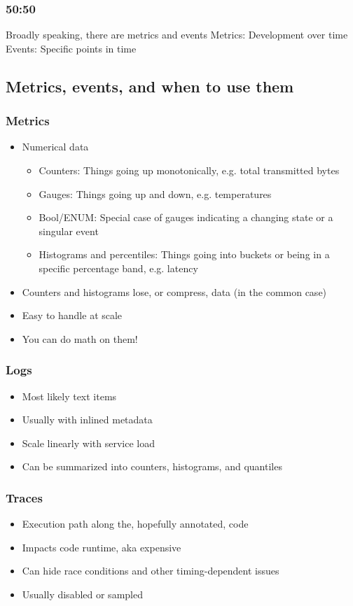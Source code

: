 \documentclass[aspectratio=169]{beamer}
\begin{document}
\begin{frame}
	\frametitle{50:50}
	\begin{center}
		\vfill
		Broadly speaking, there are metrics and events
		\vfill
		Metrics: Development over time
		\vfill
		Events: Specific points in time
		\vfill
	\end{center}
\end{frame}


\subsection{Metrics, events, and when to use them}

\begin{frame}
	\frametitle{Metrics}
	\begin{itemize}
		\item Numerical data
		\begin{itemize}
			\item Counters: Things going up monotonically, e.g. total transmitted bytes
			\item Gauges: Things going up and down, e.g. temperatures
			\item Bool/ENUM: Special case of gauges indicating a changing state or a singular event
			\item Histograms and percentiles: Things going into buckets or being in a specific percentage band, e.g. latency
		\end{itemize}
		\item Counters and histograms lose, or compress, data (in the common case)
		\item Easy to handle at scale
		\item You can do math on them!
	\end{itemize}
\end{frame}


\begin{frame}
	\frametitle{Logs}
	\begin{itemize}
		\item Most likely text items
		\item Usually with inlined metadata
		\item Scale linearly with service load
		\item Can be summarized into counters, histograms, and quantiles
	\end{itemize}
\end{frame}

\begin{frame}
	\frametitle{Traces}
	\begin{itemize}
		\item Execution path along the, hopefully annotated, code
		\item Impacts code runtime, aka expensive
		\item Can hide race conditions and other timing-dependent issues
		\item Usually disabled or sampled
	\end{itemize}
\end{frame}
\end{document}
